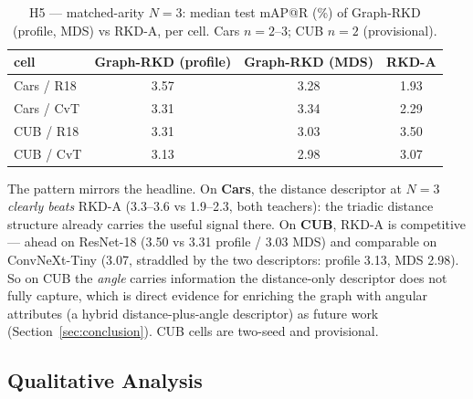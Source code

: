 \documentclass[11pt,letterpaper]{article}
\begin{document}
\begin{table}[htbp]
    \centering\small
    \caption{H5 --- matched-arity $N{=}3$: median test mAP@R (\%) of Graph-RKD (profile,
             MDS) vs RKD-A, per cell. Cars $n{=}2$--$3$; CUB $n{=}2$ (provisional).}
    \label{tab:h5}
    \begin{tabular}{lccc}
        \toprule
        cell & Graph-RKD (profile) & Graph-RKD (MDS) & RKD-A \\
        \midrule
        Cars / R18 & 3.57 & 3.28 & 1.93 \\
        Cars / CvT & 3.31 & 3.34 & 2.29 \\
        CUB / R18  & 3.31 & 3.03 & 3.50 \\
        CUB / CvT  & 3.13 & 2.98 & 3.07 \\
        \bottomrule
    \end{tabular}
\end{table}

The pattern mirrors the headline. On \textbf{Cars}, the distance descriptor at $N{=}3$
\emph{clearly beats} RKD-A (3.3--3.6 vs 1.9--2.3, both teachers): the triadic distance
structure already carries the useful signal there. On \textbf{CUB}, RKD-A is
competitive --- ahead on ResNet-18 (3.50 vs 3.31 profile / 3.03 MDS) and comparable on
ConvNeXt-Tiny (3.07, straddled by the two descriptors: profile 3.13, MDS 2.98). So on
CUB the \emph{angle} carries information the distance-only descriptor does not fully
capture, which is direct evidence for enriching the graph with angular attributes (a
hybrid distance-plus-angle descriptor) as future work (Section~\ref{sec:conclusion}).
CUB cells are two-seed and provisional.

\subsection{Qualitative Analysis}
\label{sec:results-qual}
\end{document}
